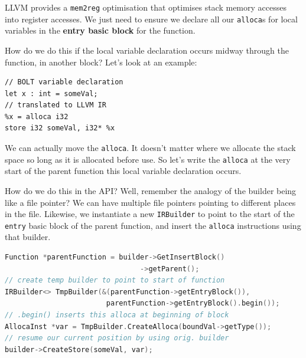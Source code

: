 LLVM provides a \texttt{mem2reg} optimisation that optimises stack
memory accesses into register accesses. We just need to ensure we
declare all our \texttt{alloca}s for local variables in the
\textbf{entry basic block} for the function.

How do we do this if the local variable declaration occurs midway
through the function, in another block? Let's look at an example:


\begin{verbatim}
// BOLT variable declaration
let x : int = someVal;
// translated to LLVM IR
%x = alloca i32
store i32 someVal, i32* %x
\end{verbatim}

We can actually move the \texttt{alloca}. It doesn't matter where we
allocate the stack space so long as it is allocated before use. So let's
write the \texttt{alloca} at the very start of the parent function this
local variable declaration occurs.

How do we do this in the API? Well, remember the analogy of the builder
being like a file pointer? We can have multiple file pointers pointing
to different places in the file. Likewise, we instantiate a new
\texttt{IRBuilder} to point to the start of the \texttt{entry} basic
block of the parent function, and insert the \texttt{alloca}
instructions using that builder.

%

\begin{lstlisting}[language=C++,caption={expr\_codegen.cc}]
Function *parentFunction = builder->GetInsertBlock()
                                ->getParent();
// create temp builder to point to start of function
IRBuilder<> TmpBuilder(&(parentFunction->getEntryBlock()),
                        parentFunction->getEntryBlock().begin());
// .begin() inserts this alloca at beginning of block
AllocaInst *var = TmpBuilder.CreateAlloca(boundVal->getType());
// resume our current position by using orig. builder
builder->CreateStore(someVal, var);
\end{lstlisting}

